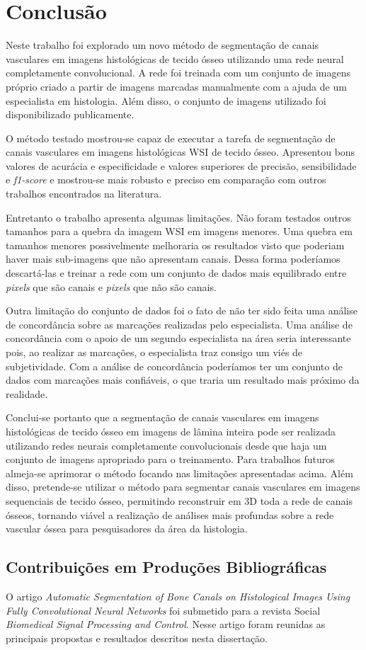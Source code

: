 \chapter[Conclusão]{Conclusão}

Neste trabalho foi explorado um novo método de segmentação de canais vasculares em imagens histológicas de tecido ósseo utilizando uma rede neural completamente convolucional. A rede foi treinada com um conjunto de imagens próprio criado a partir de imagens marcadas manualmente com a ajuda de um especialista em histologia. Além disso, o conjunto de imagens utilizado foi disponibilizado publicamente. 

O método testado mostrou-se capaz de executar a tarefa de segmentação de canais vasculares em imagens histológicas WSI de tecido ósseo. Apresentou bons valores de acurácia e especificidade e valores superiores de precisão, sensibilidade e \textit{f1-score} e mostrou-se mais robusto e preciso em comparação com outros trabalhos encontrados na literatura. 

Entretanto o trabalho apresenta algumas limitações. Não foram testados outros tamanhos para a quebra da imagem WSI em imagens menores. Uma quebra em tamanhos menores possivelmente melhoraria os resultados visto que  poderiam haver mais sub-imagens que não apresentam canais. Dessa forma poderíamos descartá-las e treinar a rede com um conjunto de dados mais equilibrado entre \textit{pixels} que são canais e \textit{pixels} que não são canais.

Outra limitação do conjunto de dados foi o fato de não ter sido feita uma análise de concordância sobre as marcações realizadas pelo especialista. Uma análise de concordância com o apoio de um segundo especialista na área seria interessante pois, ao realizar as marcações, o especialista traz consigo um viés de subjetividade. Com a análise de concordância poderíamos ter um conjunto de dados com marcações mais confiáveis, o que traria um resultado mais próximo da realidade.

Conclui-se portanto que a segmentação de canais vasculares em imagens histológicas de tecido ósseo em imagens de lâmina inteira pode ser realizada utilizando redes neurais completamente convolucionais desde que haja um conjunto de imagens apropriado para o treinamento. Para trabalhos futuros almeja-se aprimorar o método focando nas limitações apresentadas acima. Além disso, pretende-se utilizar o método para segmentar canais vasculares em imagens sequenciais de tecido ósseo, permitindo reconstruir em 3D toda a rede de canais ósseos, tornando viável a realização de análises mais profundas sobre a rede vascular óssea para pesquisadores da área da histologia.

\section{Contribuições em Produções Bibliográficas}

O artigo \textit{Automatic Segmentation of Bone Canals on Histological Images Using Fully Convolutional Neural Networks}
foi submetido para a revista Social \textit{Biomedical Signal Processing and Control}. Nesse artigo foram reunidas as principais propostas e resultados descritos nesta dissertação.